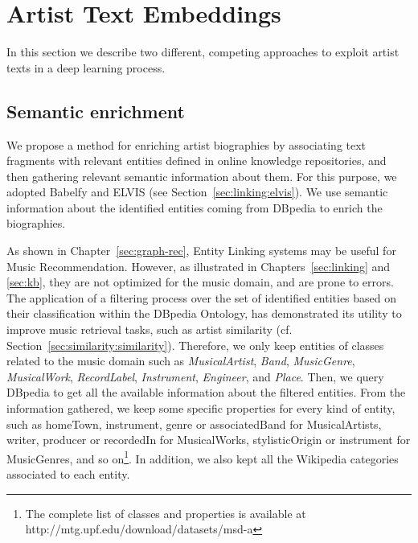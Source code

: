 \section{Artist Text Embeddings}\label{sec:cold-rec:text}

In this section we describe two different, competing approaches to exploit artist texts in a deep learning process. %

\subsection{Semantic enrichment}\label{sec:cold-rec:sem}

We propose a method for enriching artist biographies by associating text fragments with relevant entities defined in online knowledge repositories, and then gathering relevant semantic information about them. For this purpose, we adopted Babelfy \citep{Moroetal2014} and ELVIS (see Section~\ref{sec:linking:elvis}). We use semantic information about the identified entities coming from DBpedia to enrich the biographies. 

As shown in Chapter~\ref{sec:graph-rec}, Entity Linking systems may be useful for Music Recommendation. However, as illustrated in Chapters~\ref{sec:linking} and \ref{sec:kb}, they are not optimized for the music domain, and are prone to errors. The application of a filtering process over the set of identified entities based on their classification within the DBpedia Ontology, has demonstrated its utility to improve music retrieval tasks, such as artist similarity (cf. Section~\ref{sec:similarity:similarity}). Therefore, we only keep entities of classes related to the music domain such as \textit{MusicalArtist}, \textit{Band}, \textit{MusicGenre}, \textit{MusicalWork}, \textit{RecordLabel}, \textit{Instrument}, \textit{Engineer}, and \textit{Place}. Then, we query DBpedia to get all the available information about the filtered entities. From the information gathered, we keep some specific properties for every kind of entity, such as homeTown, instrument, genre or associatedBand for MusicalArtists, writer, producer or recordedIn for MusicalWorks, stylisticOrigin or instrument for MusicGenres, and so on\footnote{The complete list of classes and properties is available at http://mtg.upf.edu/download/datasets/msd-a}. In addition, we also kept all the Wikipedia categories associated to each entity.

